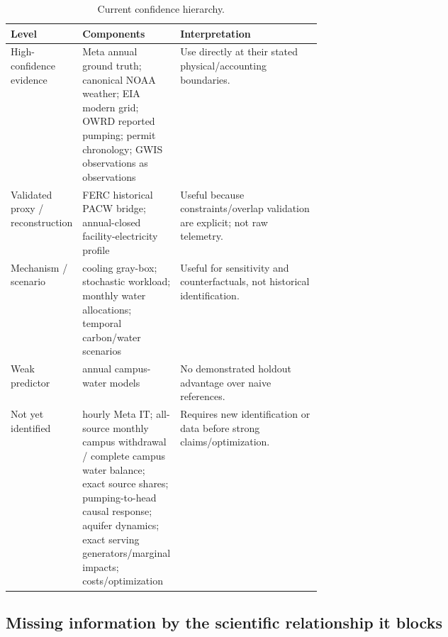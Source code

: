 \documentclass[11pt]{article}
\begin{document}
\begin{table}[ht]
\centering
\small
\begin{tabularx}{\linewidth}{@{}p{0.20\linewidth}p{0.31\linewidth}Y@{}}
\toprule
\textbf{Level} & \textbf{Components} & \textbf{Interpretation} \\
\midrule
High-confidence evidence & Meta annual ground truth; canonical NOAA weather; EIA modern grid; OWRD reported pumping; permit chronology; GWIS observations as observations & Use directly at their stated physical/accounting boundaries. \\
Validated proxy / reconstruction & FERC historical PACW bridge; annual-closed facility-electricity profile & Useful because constraints/overlap validation are explicit; not raw telemetry. \\
Mechanism / scenario & cooling gray-box; stochastic workload; monthly water allocations; temporal carbon/water scenarios & Useful for sensitivity and counterfactuals, not historical identification. \\
Weak predictor & annual campus-water models & No demonstrated holdout advantage over naive references. \\
Not yet identified & hourly Meta IT; all-source monthly campus withdrawal / complete campus water balance; exact source shares; pumping-to-head causal response; aquifer dynamics; exact serving generators/marginal impacts; costs/optimization & Requires new identification or data before strong claims/optimization. \\
\bottomrule
\end{tabularx}
\caption{Current confidence hierarchy.}
\end{table}

\subsection*{Missing information by the scientific relationship it blocks}
\end{document}
